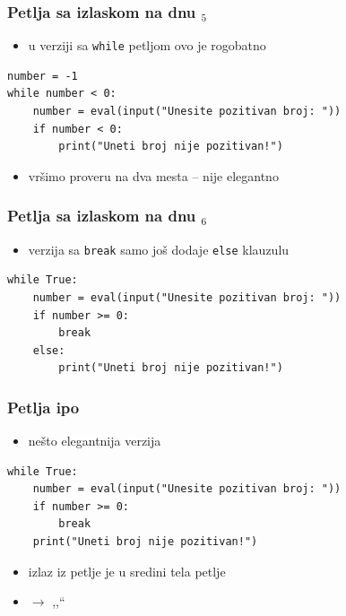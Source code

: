 \documentclass[utf8,compress]{beamer}
\begin{document}
\begin{frame}[fragile]
  \frametitle{Petlja sa izlaskom na dnu $_5$}
  \begin{itemize}
    \item u verziji sa \texttt{while} petljom ovo je rogobatno
  \end{itemize}
\begin{verbatim}
number = -1
while number < 0:
    number = eval(input("Unesite pozitivan broj: "))
    if number < 0:
        print("Uneti broj nije pozitivan!")
\end{verbatim}
  \begin{itemize}
    \item vršimo proveru na dva mesta -- nije elegantno
  \end{itemize}
\end{frame}

\begin{frame}[fragile]
  \frametitle{Petlja sa izlaskom na dnu $_6$}
  \begin{itemize}
    \item verzija sa \texttt{break} samo još dodaje \texttt{else} klauzulu
  \end{itemize}
\begin{verbatim}
while True:
    number = eval(input("Unesite pozitivan broj: "))
    if number >= 0:
        break
    else:
        print("Uneti broj nije pozitivan!")
\end{verbatim}
\end{frame}

\begin{frame}[fragile]
  \frametitle{Petlja ipo}
  \begin{itemize}
    \item nešto elegantnija verzija
  \end{itemize}
\begin{verbatim}
while True:
    number = eval(input("Unesite pozitivan broj: "))
    if number >= 0: 
        break
    print("Uneti broj nije pozitivan!")
\end{verbatim}
  \begin{itemize}
    \item izlaz iz petlje je u sredini tela petlje
    \item $\rightarrow$ ,,``
  \end{itemize}
\end{frame}
\end{document}
